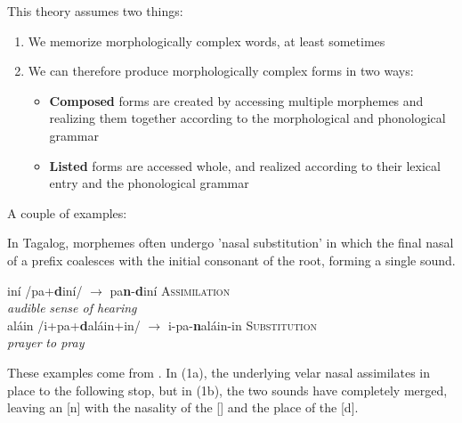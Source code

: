 \documentclass[12]{article}
\begin{document}
		This theory assumes two things:
		\begin{enumerate}
			\item We memorize morphologically complex words, at least sometimes
			\item We can therefore produce morphologically complex forms in two ways:
			\begin{itemize}
				\item {\bf Composed} forms are created by accessing multiple morphemes and realizing them together according to the morphological and phonological grammar
				\item {\bf Listed} forms are accessed whole, and realized according to their lexical entry and the phonological grammar
			\end{itemize}
		\end{enumerate}
	
		A couple of examples: 
							
		In Tagalog, morphemes often undergo 'nasal substitution' in which the final nasal of a prefix coalesces with the initial consonant of the root, forming a single sound.
		
		
		\begin{exe}
			\ex
				\begin{xlist}
					\ex {}in\'i\textscriptg  \hspace{3ex} /pa{\bf {}}+{\bf d}in\'i\textscriptg/ \hspace{8ex} $\rightarrow$ pa{\bf n}-{\bf d}in\'i\textscriptg   \hspace{7ex} \textsc{Assimilation}\\
					{\it audible} {} {} {} {\it sense of hearing}\\
					\ex {}al\'ain \hspace{0.1ex} /i+pa{\bf \textipa{N}}+{\bf d}al\'ain+in/  $\rightarrow$ \textglotstop i-pa-{\bf n}al\'ain-in \hspace{0.5ex} \textsc{Substitution}\\
					{\it prayer} {} {} {} {\it to pray}\\
				\end{xlist}
			
		\end{exe}
	
		These examples come from \citet{zuraw10}.  In (1a), the underlying velar nasal assimilates in place to the following stop, but in (1b), the two sounds have completely merged, leaving an [n] with the nasality of the [] and the place of the [d].
		
\end{document}
